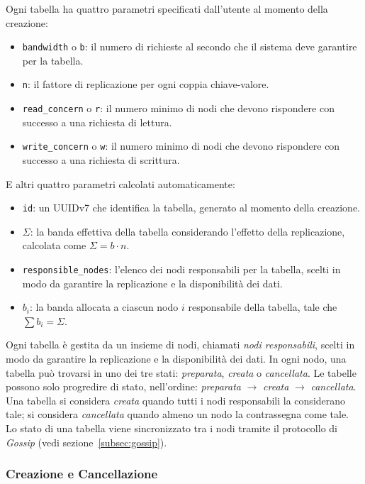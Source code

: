 Ogni tabella ha quattro parametri specificati dall'utente al momento della creazione:
\begin{itemize}
    \item \texttt{bandwidth} o \texttt{b}: il numero di richieste al secondo che il sistema deve garantire per la tabella.
    \item \texttt{n}: il fattore di replicazione per ogni coppia chiave-valore.
    \item \texttt{read\_concern} o \texttt{r}: il numero minimo di nodi che devono rispondere con successo a una richiesta di lettura.
    \item \texttt{write\_concern} o \texttt{w}: il numero minimo di nodi che devono rispondere con successo a una richiesta di scrittura.
\end{itemize}

E altri quattro parametri calcolati automaticamente:
\begin{itemize}
    \item \texttt{id}: un UUIDv7 che identifica la tabella, generato al momento della creazione.
    \item $\Sigma$: la banda effettiva della tabella considerando l'effetto della replicazione, calcolata come $\displaystyle \Sigma = b \cdot n$.
    \item \texttt{responsible\_nodes}: l'elenco dei nodi responsabili per la tabella, scelti in modo da garantire la replicazione e la disponibilità dei dati.
    \item $b_i$: la banda allocata a ciascun nodo $i$ responsabile della tabella, tale che $\displaystyle \sum b_i = \Sigma$.
\end{itemize}

Ogni tabella è gestita da un insieme di nodi, chiamati \emph{nodi responsabili}, scelti in modo da garantire la replicazione e la disponibilità dei dati.
In ogni nodo, una tabella può trovarsi in uno dei tre stati: \emph{preparata}, \emph{creata} o \emph{cancellata}.
Le tabelle possono solo progredire di stato, nell'ordine: \emph{preparata} $\rightarrow$ \emph{creata} $\rightarrow$ \emph{cancellata}.
Una tabella si considera \emph{creata} quando tutti i nodi responsabili la considerano tale; si considera \emph{cancellata} quando almeno un nodo la contrassegna come tale.
Lo stato di una tabella viene sincronizzato tra i nodi tramite il protocollo di \emph{Gossip} (vedi sezione~\ref{subsec:gossip}).

\subsubsection{Creazione e Cancellazione}
\label{subsubsec:creazione-cancellazione}

